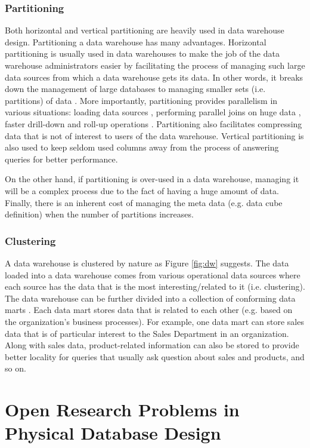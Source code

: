 \documentclass[12pt,a4paper]{article}
\begin{document}
\subsubsection{Partitioning}
Both horizontal and vertical partitioning are heavily used in data warehouse design. Partitioning a data warehouse has many advantages. Horizontal partitioning
is usually used in data warehouses to make the job of the data warehouse administrators easier by facilitating the process of managing such large data
sources from which a data warehouse gets its data. In other words, it breaks down the management of large databases to managing smaller sets (i.e. partitions)
of data \cite{thusoo2010data}. More importantly, partitioning provides parallelism in various situations: loading data sources \cite{barclay1994loading},
performing parallel joins on huge data \cite{datta2002parallel}, faster drill-down and roll-up operations \cite{chaudhuri1997overview}. Partitioning also
facilitates compressing data that is not of interest to users of the data warehouse. Vertical partitioning is also used to keep seldom used columns away from
the process of answering queries for better performance.

On the other hand, if partitioning is over-used in a data warehouse, managing it will be a complex process due to the fact of having a huge amount of
data.
Finally, there is an inherent cost of managing the meta data (e.g. data cube definition) when the number of partitions increases.

\subsubsection{Clustering}
A data warehouse is clustered by nature as Figure \ref{fig:dw} suggests. The data loaded into a data warehouse comes from various operational data sources where
each source has the data that is the most interesting/related to it (i.e. clustering). The data warehouse can be further divided into a collection of
conforming data marts \cite{sen2005comparison}. Each data mart stores data that is related to each other (e.g. based on the organization's business processes).
For example, one data mart can store sales data that is of particular interest to the Sales Department in an organization. Along with sales data,
product-related information can also be stored to provide better locality for queries that usually ask question about sales and products, and so on.

\section{Open Research Problems in Physical Database Design}
\label{SEC-OPEN}
\end{document}

